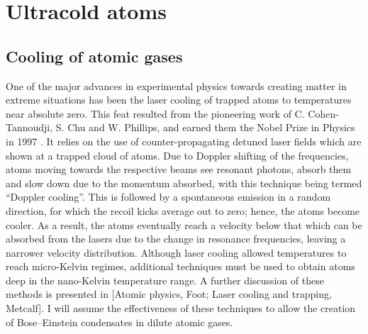 \section{Ultracold atoms}\label{sec:coldatoms}
\subsection{Cooling of atomic gases}\label{sub:cooling}
One of the major advances in experimental physics towards creating matter in extreme situations has been the laser cooling of trapped atoms to temperatures near absolute zero. This feat resulted from the pioneering work of C. Cohen-Tannoudji, S. Chu and W.
Phillips, and earned them the Nobel Prize in Physics in 1997 \cite{AO:Chu_revmod_1998,AO:Cohen_revmod_1998,AO:Phillips_revmod_1998}.
It relies on the use of counter-propagating detuned laser fields which are shown at a trapped cloud of atoms. Due to Doppler shifting of the frequencies, atoms moving towards the respective beams see resonant photons, absorb them and slow down due to the momentum absorbed, with this technique being termed ``Doppler cooling''. This is followed by a spontaneous emission in a random direction, for which the recoil kicks average out to zero; hence, the atoms become cooler. As a result, the atoms eventually reach a velocity below that which can be absorbed from the lasers due to the change in resonance frequencies, leaving a narrower velocity distribution. Although laser cooling allowed temperatures to reach micro-Kelvin regimes, additional techniques must be used to obtain atoms deep in the nano-Kelvin temperature range. A further discussion of these methods is presented in [Atomic physics, Foot; Laser cooling and trapping, Metcalf].
I will assume the effectiveness of these techniques to allow the creation of Bose--Einstein condensates in dilute atomic gases.

